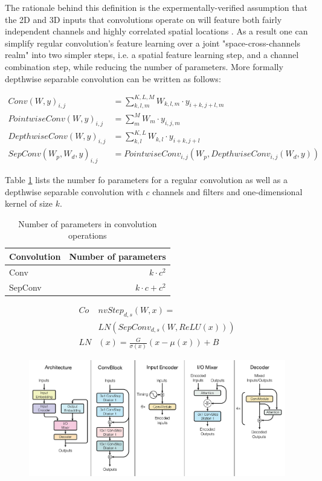 \documentclass[a4paper]{article}
\begin{document}
The rationale behind this definition  is  the  expermentally-verified assumption
that the  2D and 3D inputs that convolutions operate on will feature both fairly
independent    channels    and    highly    correlated     spatial     locations
\cite{DBLP:journals/corr/KaiserGC17}.  As  a  result one  can  simplify  regular
convolution's  feature  learning over  a joint "space-cross-channels realm" into
two  simpler  steps,  i.e.  a  spatial  feature  learning  step,  and a  channel
combination  step, while  reducing  the  number  of  parameters.  More  formally
depthwise separable convolution can be written as follows:


\begin{align*}
  Conv(W, y)_{i,j} &= \sum_{k,l,m}^{K,L,M}{W_{k,l,m} \cdot y_{i+k,j+l,m}} \\
  PointwiseConv(W, y)_{i,j} &= \sum_{m}^{M}{W_m \cdot y_{i,j,m}} \\
  DepthwiseConv(W, y)_{i,j} &= \sum_{k,l}^{K,L}{W_{k,l} \cdot y_{i+k,j+l}} \\
  SepConv(W_p, W_d, y)_{i,j} &=
    PointwiseConv_{i,j}(W_p, DepthwiseConv_{i,j}(W_d, y))
\end{align*}


Table \ref{tab:convpar} lists the number fo parameters for a regular convolution
as well as a depthwise separable convolution with $c$ channels  and  filters and
one-dimensional kernel of size $k$.


\begin{table}
  \center
  \begin{tabular}{lr}
  \hline
    Convolution & Number of parameters\\
  \hline
    Conv & $k \cdot c^2$ \\
    SepConv & $k \cdot c + c^2$ \\
  \hline
  \end{tabular}
  \caption{Number of parameters in convolution operations}
  \label{tab:convpar}
\end{table}


\begin{align*}
  Co&nvStep_{d,s}(W, x) = \\
  &LN(SepConv_{d,s}(W, ReLU(x))) \\
  LN&(x) = \frac{G}{\sigma(x)}(x - \mu(x)) + B
\end{align*}


\begin{figure}
  \center
  \includegraphics[width=\textwidth]{img/SN}
\end{figure}
\end{document}

